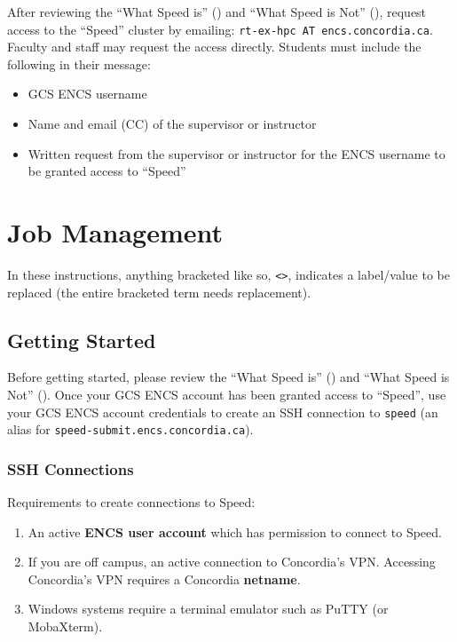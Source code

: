 \documentclass{easychair}
\begin{document}
After reviewing the ``What Speed is'' () and
``What Speed is Not'' (), request access to the ``Speed'' 
cluster by emailing: \texttt{rt-ex-hpc AT encs.concordia.ca}.
%
Faculty and staff may request the access directly.
Students must include the following in their message:

\begin{itemize} 
	\item GCS ENCS username
	\item Name and email (CC) of the supervisor or instructor
	\item Written request from the supervisor or instructor for the ENCS username to be granted access to ``Speed''
\end{itemize}

\section{Job Management}
\label{sect:job-management}

In these instructions, anything bracketed like so, \verb+<>+, indicates a
label/value to be replaced (the entire bracketed term needs replacement).

\subsection{Getting Started}

Before getting started, please review the ``What Speed is'' ()
and ``What Speed is Not'' ().
Once your GCS ENCS account has been granted access to ``Speed'',
use your GCS ENCS account credentials to create an SSH connection to 
\texttt{speed} (an alias for \texttt{speed-submit.encs.concordia.ca}). 

\subsubsection{SSH Connections}

Requirements to create connections to Speed:
\begin{enumerate}
	\item
An active \textbf{ENCS user account} which has permission to connect to Speed.
	\item
If you are off campus, an active connection to Concordia's VPN.
Accessing Concordia's VPN requires a Concordia \textbf{netname}. 
	\item
Windows systems require a terminal emulator such as PuTTY (or MobaXterm). 
\end{enumerate}
\end{document}
